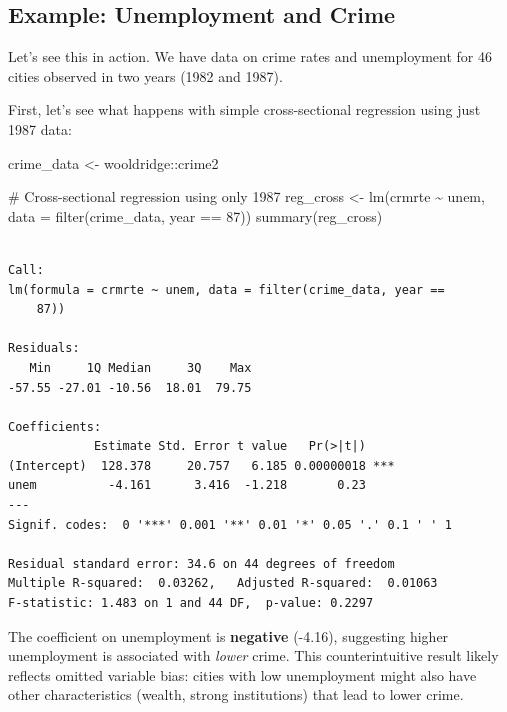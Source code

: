 \documentclass[
  letterpaper,
  DIV=11,
  numbers=noendperiod]{scrreprt}
\newenvironment{Shaded}{\begin{snugshade}}{\end{snugshade}}
\newcommand{\AttributeTok}[1]{\textcolor[rgb]{0.40,0.45,0.13}{#1}}
\newcommand{\CommentTok}[1]{\textcolor[rgb]{0.37,0.37,0.37}{#1}}
\newcommand{\DecValTok}[1]{\textcolor[rgb]{0.68,0.00,0.00}{#1}}
\newcommand{\FunctionTok}[1]{\textcolor[rgb]{0.28,0.35,0.67}{#1}}
\newcommand{\NormalTok}[1]{\textcolor[rgb]{0.00,0.23,0.31}{#1}}
\newcommand{\OtherTok}[1]{\textcolor[rgb]{0.00,0.23,0.31}{#1}}
\newcommand{\SpecialCharTok}[1]{\textcolor[rgb]{0.37,0.37,0.37}{#1}}
\begin{document}
\subsection{Example: Unemployment and
Crime}\label{example-unemployment-and-crime}

Let's see this in action. We have data on crime rates and unemployment
for 46 cities observed in two years (1982 and 1987).

First, let's see what happens with simple cross-sectional regression
using just 1987 data:

\begin{Shaded}
\begin{Highlighting}[]
\NormalTok{crime\_data }\OtherTok{\textless{}{-}}\NormalTok{ wooldridge}\SpecialCharTok{::}\NormalTok{crime2}

\CommentTok{\# Cross{-}sectional regression using only 1987}
\NormalTok{reg\_cross }\OtherTok{\textless{}{-}} \FunctionTok{lm}\NormalTok{(crmrte }\SpecialCharTok{\textasciitilde{}}\NormalTok{ unem, }\AttributeTok{data =} \FunctionTok{filter}\NormalTok{(crime\_data, year }\SpecialCharTok{==} \DecValTok{87}\NormalTok{))}
\FunctionTok{summary}\NormalTok{(reg\_cross)}
\end{Highlighting}
\end{Shaded}

\begin{verbatim}

Call:
lm(formula = crmrte ~ unem, data = filter(crime_data, year == 
    87))

Residuals:
   Min     1Q Median     3Q    Max 
-57.55 -27.01 -10.56  18.01  79.75 

Coefficients:
            Estimate Std. Error t value   Pr(>|t|)    
(Intercept)  128.378     20.757   6.185 0.00000018 ***
unem          -4.161      3.416  -1.218       0.23    
---
Signif. codes:  0 '***' 0.001 '**' 0.01 '*' 0.05 '.' 0.1 ' ' 1

Residual standard error: 34.6 on 44 degrees of freedom
Multiple R-squared:  0.03262,   Adjusted R-squared:  0.01063 
F-statistic: 1.483 on 1 and 44 DF,  p-value: 0.2297
\end{verbatim}

The coefficient on unemployment is \textbf{negative} (-4.16), suggesting
higher unemployment is associated with \emph{lower} crime. This
counterintuitive result likely reflects omitted variable bias: cities
with low unemployment might also have other characteristics (wealth,
strong institutions) that lead to lower crime.
\end{document}
